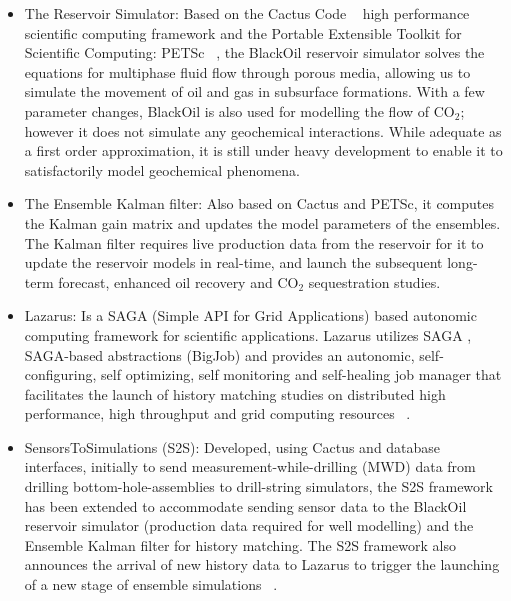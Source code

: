 \documentclass[10pt,conference,final]{IEEEtran}
\begin{document}
\begin{itemize}
\item The Reservoir Simulator: Based on the Cactus Code ~\cite{cactus_web} high 
performance scientific computing framework and the Portable Extensible Toolkit for 
Scientific Computing: PETSc ~\cite{PETSc}, the BlackOil reservoir simulator solves the 
equations for multiphase fluid flow through porous media, allowing us to simulate the 
movement of oil and gas in subsurface formations. With a few parameter changes, BlackOil 
is also used for modelling the flow of CO$_2$; however it does not
simulate any geochemical interactions. While adequate as a first order approximation, it is 
still under heavy development to enable it to satisfactorily model geochemical phenomena.

\item The Ensemble Kalman filter: Also based on Cactus and PETSc, it computes the Kalman 
gain matrix and updates the model parameters of the ensembles. The Kalman filter requires 
live production data from the reservoir for it to update the reservoir models in 
real-time, and launch the subsequent long-term forecast, enhanced oil recovery and CO$_2$ 
sequestration studies.

\item Lazarus: Is a SAGA (Simple API for Grid Applications) based autonomic computing 
framework for scientific applications. Lazarus utilizes SAGA , SAGA-based 
abstractions (BigJob) and provides an autonomic, self-configuring, self optimizing, self 
monitoring and self-healing job manager that facilitates the launch of history matching 
studies on distributed high performance, high throughput and grid computing resources 
~\cite{gmac}.

\item SensorsToSimulations (S2S): Developed, using Cactus and database interfaces, 
initially to send measurement-while-drilling (MWD) data from drilling 
bottom-hole-assemblies to drill-string simulators, the S2S framework has been extended to 
accommodate sending sensor data to the BlackOil reservoir simulator (production data 
required for well modelling) and the Ensemble Kalman filter for history matching. The S2S 
framework also announces the arrival of new history data to Lazarus to trigger the 
launching of a new stage of ensemble simulations ~\cite{Duff2,Duff1}.

\end{itemize}
\end{document}
